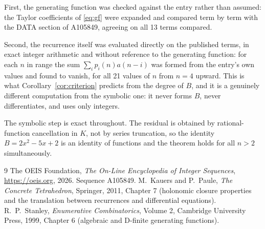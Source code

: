 \documentclass[11pt,a4paper]{article}
\theoremstyle{plain}
\theoremstyle{definition}
\begin{document}
First, the generating function was checked against the entry rather than assumed: the
Taylor coefficients of \eqref{eq:gf} were expanded and compared term by term with the DATA
section of A105849, agreeing on all 13 terms compared.

Second, the recurrence itself was evaluated directly on the published terms, in exact
integer arithmetic and without reference to the generating function: for each $n$ in range
the sum $\sum_{i}p_{i}(n)a(n-i)$ was formed from the entry's own values and found to
vanish, for all 21 values of $n$ from $n=4$ upward. This is what
Corollary~\ref{cor:criterion} predicts from the degree of $B$, and it is a genuinely
different computation from the symbolic one: it never forms $B$, never differentiates, and
uses only integers.

The symbolic step is exact throughout. The residual is obtained by rational-function
cancellation in $K$, not by series truncation, so the identity $B=2 x^{2} - 5 x + 2$ is an
identity of functions and the theorem holds for all $n>2$ simultaneously.

\begin{thebibliography}{9}
 The OEIS Foundation, \emph{The On-Line Encyclopedia of Integer Sequences},
\url{https://oeis.org}, 2026. Sequence A105849.
 M.~Kauers and P.~Paule, \emph{The Concrete Tetrahedron}, Springer, 2011,
Chapter 7 (holonomic closure properties and the translation between recurrences and
differential equations).
 R.~P.~Stanley, \emph{Enumerative Combinatorics}, Volume 2, Cambridge
University Press, 1999, Chapter 6 (algebraic and D-finite generating functions).
\end{thebibliography}
\end{document}
